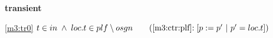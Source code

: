 \textbf{transient}
\begin{block}
\item[ \eqref{m3:tr0} ]{$t \in in  %
			\1\land loc.t \in plf \setminus osgn  \qquad \text{(\ref{m3:ctr:plf}$: [p := p'~|~p' = loc.t]$)}$} %
\end{block}
